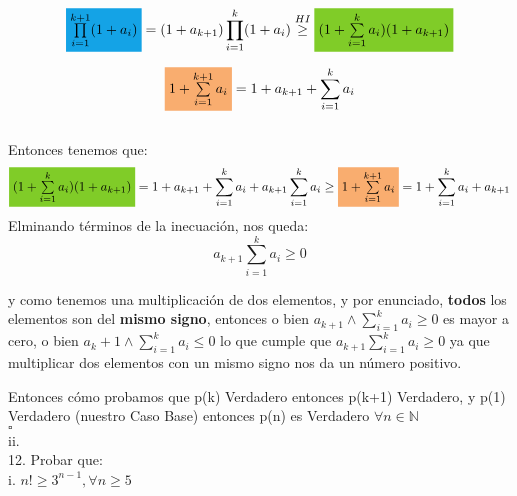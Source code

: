 \documentclass[a4paper,11pt]{article}
\begin{document}
\[ \colorbox{Cerulean}{$\prod\limits_{i=1}^{k+1}(1+a_i)$} = (1+a_{k+1}) \prod\limits_{i=1}^{k}(1+a_i) \stackrel{HI}{\geq} \colorbox{LimeGreen}{$(1 + \sum\limits_{i=1}^{k} a_i)(1+a_{k+1})$} \]

\[ \colorbox{Apricot}{$1 + \sum\limits_{i=1}^{k+1} a_i $} = 1+a_{k+1} + \sum\limits_{i=1}^{k} a_i \]
\\
Entonces tenemos que:
\[\colorbox{LimeGreen}{$ (1 + \sum\limits_{i=1}^{k} a_i)(1+a_{k+1})$} = 1 + a_{k+1} + \sum\limits_{i=1}^{k} a_i + a_{k+1} \sum\limits_{i=1}^{k} a_i \geq \colorbox{Apricot}{$1 + \sum\limits_{i=1}^{k+1} a_i$} = 1 + \sum\limits_{i=1}^{k} a_i + a_{k+1} \] 
Elminando términos de la inecuación, nos queda:\\
\[ a_{k+1} \sum\limits_{i=1}^{k} a_i \geq 0\] 

y como tenemos una multiplicación de dos elementos, y por enunciado, \textbf{todos} los elementos son del \textbf{mismo signo}, entonces o bien $a_{k+1} \land \sum\limits_{i=1}^{k} a_i \geq 0 $ es mayor a cero, o bien $a_k+1 \land \sum\limits_{i=1}^{k} a_i \leq 0 $  lo que cumple que $a_{k+1} \sum\limits_{i=1}^{k} a_i \geq 0$ ya que multiplicar dos elementos con un mismo signo nos da un número positivo.
 
Entonces cómo probamos que p(k) Verdadero entonces p(k+1) Verdadero, y p(1) Verdadero (nuestro Caso Base) entonces p(n) es Verdadero $\forall n\in\mathbb{N}$\\

\hfill$\square $\\
ii.\\
12. Probar que:\\
i. $n! \geq 3^{n-1}, \forall n\geq 5 $
\end{document}
